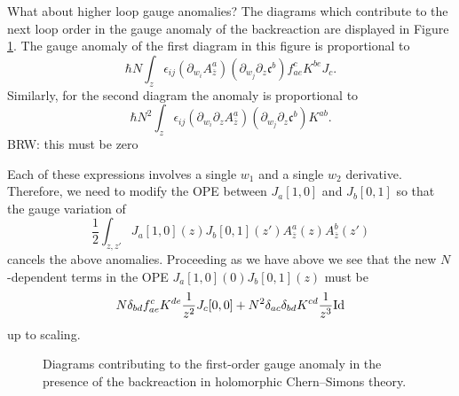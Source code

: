 \documentclass[11pt]{amsart}
\newcommand{\zbar}{\br{z}}
\newcommand{\eps}{\epsilon}
\newcommand{\br}{\overline}
\newcommand{\mf}{\mathfrak}
\def\brian#1{{\textcolor{blue!65!red}{BRW: {#1}}}}
\theoremstyle{thm}
\numberwithin{equation}{subsection}
\theoremstyle{def}
\theoremstyle{rem}
\newcommand{\fc}{\mf{c}}
\begin{document}
What about higher loop gauge anomalies? 
The diagrams which contribute to the next loop order in the gauge anomaly of the backreaction are displayed in Figure \ref{fig:hcsback}.
The gauge anomaly of the first diagram in this figure is proportional to
\[
\hbar N \int_z \eps_{ij} (\partial_{w_i} A_{\zbar}^a) (\partial_{w_j}  \partial_z \fc^b) f_{ae}^c K^{be} J_c .
\]
Similarly, for the second diagram the anomaly is proportional to
\[
\hbar N^2 \int_z \eps_{ij} (\partial_{w_i} \partial_z A_{\zbar}^a) (\partial_{w_j} \partial_z \fc^b) K^{ab} .
\]
\brian{this must be zero}

Each of these expressions involves a single $w_1$ and a single $w_2$ derivative. 
Therefore, we need to modify the OPE between $J_a[1,0]$ and $J_b[0,1]$ so that the gauge variation of 
\[
\frac12 \int_{z,z'} J_a [1,0] (z) J_b [0,1](z') A_{\zbar}^a (z) A_{\zbar}^b (z') 
\]
cancels the above anomalies. 
Proceeding as we have above we see that the new $N$-dependent terms in  the OPE $J_a[1,0] (0) J_b [0,1](z)$ must be
\[
N \delta_{bd} f^c_{ae} K^{de}  \frac{1}{z^2} J_c[0,0] + N^2 \delta_{ac} \delta_{bd} K^{cd} \frac{1}{z^3} {\rm Id} 
\]
up to scaling. 

\begin{figure}
	\label{fig:hcsback}
	\caption{Diagrams contributing to the first-order gauge anomaly in the presence of the backreaction in holomorphic Chern--Simons theory.}  
\end{figure}
\end{document}
